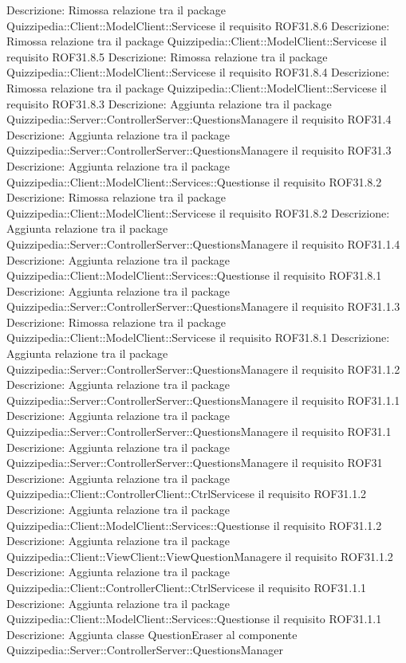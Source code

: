 Descrizione: Rimossa relazione tra il package Quizzipedia::Client::ModelClient::Servicese il requisito ROF31.8.6 
Descrizione: Rimossa relazione tra il package Quizzipedia::Client::ModelClient::Servicese il requisito ROF31.8.5 
Descrizione: Rimossa relazione tra il package Quizzipedia::Client::ModelClient::Servicese il requisito ROF31.8.4 
Descrizione: Rimossa relazione tra il package Quizzipedia::Client::ModelClient::Servicese il requisito ROF31.8.3 
Descrizione: Aggiunta relazione tra il package Quizzipedia::Server::ControllerServer::QuestionsManagere il requisito ROF31.4 
Descrizione: Aggiunta relazione tra il package Quizzipedia::Server::ControllerServer::QuestionsManagere il requisito ROF31.3 
Descrizione: Aggiunta relazione tra il package Quizzipedia::Client::ModelClient::Services::Questionse il requisito ROF31.8.2 
Descrizione: Rimossa relazione tra il package Quizzipedia::Client::ModelClient::Servicese il requisito ROF31.8.2 
Descrizione: Aggiunta relazione tra il package Quizzipedia::Server::ControllerServer::QuestionsManagere il requisito ROF31.1.4 
Descrizione: Aggiunta relazione tra il package Quizzipedia::Client::ModelClient::Services::Questionse il requisito ROF31.8.1 
Descrizione: Aggiunta relazione tra il package Quizzipedia::Server::ControllerServer::QuestionsManagere il requisito ROF31.1.3 
Descrizione: Rimossa relazione tra il package Quizzipedia::Client::ModelClient::Servicese il requisito ROF31.8.1 
Descrizione: Aggiunta relazione tra il package Quizzipedia::Server::ControllerServer::QuestionsManagere il requisito ROF31.1.2 
Descrizione: Aggiunta relazione tra il package Quizzipedia::Server::ControllerServer::QuestionsManagere il requisito ROF31.1.1 
Descrizione: Aggiunta relazione tra il package Quizzipedia::Server::ControllerServer::QuestionsManagere il requisito ROF31.1 
Descrizione: Aggiunta relazione tra il package Quizzipedia::Server::ControllerServer::QuestionsManagere il requisito ROF31 
Descrizione: Aggiunta relazione tra il package Quizzipedia::Client::ControllerClient::CtrlServicese il requisito ROF31.1.2 
Descrizione: Aggiunta relazione tra il package Quizzipedia::Client::ModelClient::Services::Questionse il requisito ROF31.1.2 
Descrizione: Aggiunta relazione tra il package Quizzipedia::Client::ViewClient::ViewQuestionManagere il requisito ROF31.1.2 
Descrizione: Aggiunta relazione tra il package Quizzipedia::Client::ControllerClient::CtrlServicese il requisito ROF31.1.1 
Descrizione: Aggiunta relazione tra il package Quizzipedia::Client::ModelClient::Services::Questionse il requisito ROF31.1.1 
Descrizione: Aggiunta classe QuestionEraser al componente Quizzipedia::Server::ControllerServer::QuestionsManager 

